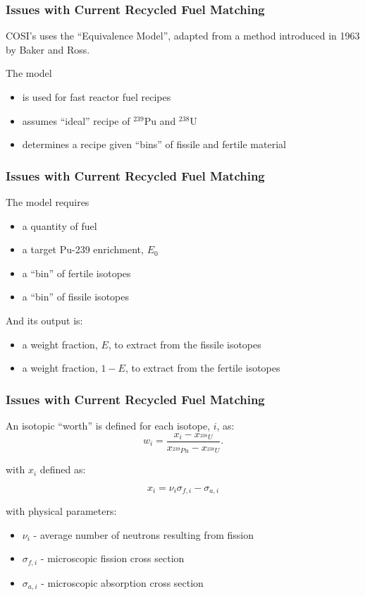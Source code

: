 \begin{frame}[ctb!]
  \frametitle{Issues with Current Recycled Fuel Matching}

  COSI's uses the ``Equivalence Model'', adapted from a method introduced in
  1963 by Baker and Ross\cite{baker_comparison_1963}.
  
  \vspace{0.2cm}

  The model
  \begin{itemize}
    \item is used for fast reactor fuel recipes
    \item assumes ``ideal'' recipe of $^{239}$Pu and $^{238}$U
    \item determines a recipe given ``bins'' of fissile and fertile material
  \end{itemize}
\end{frame}

\begin{frame}[ctb!]
  \frametitle{Issues with Current Recycled Fuel Matching}

  The model requires
  \begin{itemize}
    \item a quantity of fuel
    \item a target Pu-239 enrichment, $E_0$
    \item a ``bin'' of fertile isotopes
    \item a ``bin'' of fissile isotopes
  \end{itemize}

  And its output is:
  \begin{itemize}
    \item a weight fraction, $E$, to extract from the fissile isotopes
    \item a weight fraction, $1-E$, to extract from the fertile isotopes
  \end{itemize}
\end{frame}

\begin{frame}[ctb!]
  \frametitle{Issues with Current Recycled Fuel Matching}
  
  An isotopic ``worth'' is defined for each isotope, $i$, as:
  \begin{equation}
    w_i = \frac{x_i - x_{^{238}U}}
    {x_{^{239}Pu} - x_{^{238}U}}.
  \end{equation}

  with $x_i$ defined as:
  
  \begin{equation}
    x_i = \nu_{i} \sigma_{f,i} - \sigma_{a,i}
  \end{equation}

  with physical parameters:
  \begin{itemize}
    \item $\nu_{i}$ - average number of neutrons resulting from fission
    \item $\sigma_{f,i}$ - microscopic fission cross section
    \item $\sigma_{a,i}$ - microscopic absorption cross section
  \end{itemize}
\end{frame}

